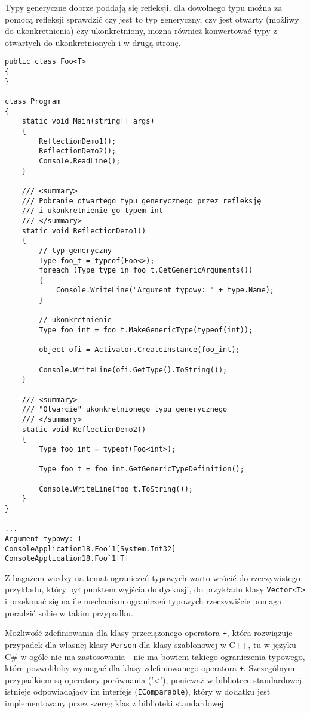 Typy generyczne dobrze poddają się refleksji, dla dowolnego typu można za pomocą refleksji sprawdzić
czy jest to typ generyczny, czy jest otwarty (możliwy do ukonkretnienia) czy ukonkretniony, można
również konwertować typy z otwartych do ukonkretnionych i w drugą stronę.

\begin{scriptsize}
\begin{verbatim}
public class Foo<T>
{
}

class Program
{
    static void Main(string[] args)
    {
        ReflectionDemo1();
        ReflectionDemo2();
        Console.ReadLine();
    }

    /// <summary>
    /// Pobranie otwartego typu generycznego przez refleksję 
    /// i ukonkretnienie go typem int
    /// </summary>
    static void ReflectionDemo1()
    {
        // typ generyczny
        Type foo_t = typeof(Foo<>);
        foreach (Type type in foo_t.GetGenericArguments())
        {
            Console.WriteLine("Argument typowy: " + type.Name);
        }

        // ukonkretnienie
        Type foo_int = foo_t.MakeGenericType(typeof(int));

        object ofi = Activator.CreateInstance(foo_int);

        Console.WriteLine(ofi.GetType().ToString());
    }

    /// <summary>
    /// "Otwarcie" ukonkretnionego typu generycznego
    /// </summary>
    static void ReflectionDemo2()
    {
        Type foo_int = typeof(Foo<int>);

        Type foo_t = foo_int.GetGenericTypeDefinition();

        Console.WriteLine(foo_t.ToString());
    }
}

...
Argument typowy: T
ConsoleApplication18.Foo`1[System.Int32]
ConsoleApplication18.Foo`1[T]
\end{verbatim}
\end{scriptsize}


Z bagażem wiedzy na temat ograniczeń typowych warto wrócić do rzeczywistego przykładu, który był punktem wyjścia
do dyskusji, do przykładu klasy {\tt Vector<T>} i przekonać się na ile mechanizm ograniczeń typowych rzeczywiście
pomaga poradzić sobie w takim przypadku.

Możliwość zdefiniowania dla klasy przeciążonego operatora {\tt +}, która rozwiązuje przypadek dla własnej klasy 
{\tt Person} dla klasy szablonowej w C++, tu w języku C\# w ogóle nie ma zastosowania - nie ma bowiem takiego
ograniczenia typowego, które pozwoliłoby wymagać dla klasy zdefiniowanego operatora {\tt +}. Szczególnym przypadkiem
są operatory porównania ('<'), ponieważ w bibliotece standardowej istnieje odpowiadający im interfejs ({\tt IComparable}), 
który w dodatku jest implementowany przez szereg klas z biblioteki standardowej.

